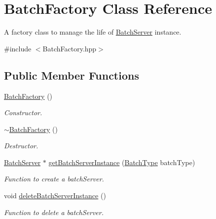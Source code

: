 \hypertarget{classBatchFactory}{
\section{BatchFactory Class Reference}
\label{classBatchFactory}
}


A factory class to manage the life of \hyperlink{classBatchServer}{BatchServer} instance.  




{\ttfamily \#include $<$BatchFactory.hpp$>$}

\subsection*{Public Member Functions}
\begin{DoxyCompactItemize}
\item 
\hypertarget{classBatchFactory_ad8bbb31a0cb233ed317ee0c9df83a659}{
\hyperlink{classBatchFactory_ad8bbb31a0cb233ed317ee0c9df83a659}{BatchFactory} ()}
\label{classBatchFactory_ad8bbb31a0cb233ed317ee0c9df83a659}

\begin{DoxyCompactList}\small\item\em Constructor. \item\end{DoxyCompactList}\item 
\hypertarget{classBatchFactory_a24536b638ac53cf338898fd183641e29}{
\hyperlink{classBatchFactory_a24536b638ac53cf338898fd183641e29}{$\sim$BatchFactory} ()}
\label{classBatchFactory_a24536b638ac53cf338898fd183641e29}

\begin{DoxyCompactList}\small\item\em Destructor. \item\end{DoxyCompactList}\item 
\hyperlink{classBatchServer}{BatchServer} $\ast$ \hyperlink{classBatchFactory_af328351dea45d4725ef1cdad782a1a22}{getBatchServerInstance} (\hyperlink{utilVishnu_8hpp_a864d748e7097d176552dd4c7635016ea}{BatchType} batchType)
\begin{DoxyCompactList}\small\item\em Function to create a batchServer. \item\end{DoxyCompactList}\item 
\hypertarget{classBatchFactory_a86f4b2ee23a61ea12a1101aa23784480}{
void \hyperlink{classBatchFactory_a86f4b2ee23a61ea12a1101aa23784480}{deleteBatchServerInstance} ()}
\label{classBatchFactory_a86f4b2ee23a61ea12a1101aa23784480}

\begin{DoxyCompactList}\small\item\em Function to delete a batchServer. \item\end{DoxyCompactList}\end{DoxyCompactItemize}
